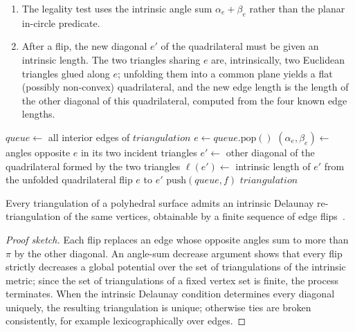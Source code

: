\begin{enumerate}
\item The legality test uses the intrinsic angle sum $\alpha_e + \beta_e$ rather than the planar in-circle predicate.
\item After a flip, the new diagonal $e'$ of the quadrilateral must be given an intrinsic length. The two triangles sharing $e$ are, intrinsically, two Euclidean triangles glued along $e$; unfolding them into a common plane yields a flat (possibly non-convex) quadrilateral, and the new edge length is the length of the other diagonal of this quadrilateral, computed from the four known edge lengths.
\end{enumerate}

\begin{algorithm}[htbp]
\caption{Intrinsic Delaunay Flip Algorithm}
\label{alg:intrinsic_delaunay_flip}
\begin{algorithmic}[1]
  \State $queue \gets$ all interior edges of $triangulation$
    \State $e \gets queue.\text{pop}()$
    \State $(\alpha_e, \beta_e) \gets$ angles opposite $e$ in its two incident triangles
      \State $e' \gets$ other diagonal of the quadrilateral formed by the two triangles
      \State $\ell(e') \gets$ intrinsic length of $e'$ from the unfolded quadrilateral
      \State flip $e$ to $e'$
        \State $\text{push}(queue, f)$
      \EndFor
    \EndIf
  \EndWhile
  \State \Return $triangulation$
\EndFunction
\end{algorithmic}
\end{algorithm}

\begin{theorem}\label{thm:intrinsic_delaunay_exists}
Every triangulation of a polyhedral surface admits an intrinsic Delaunay re-triangulation of the same vertices, obtainable by a finite sequence of edge flips~\cite{bobenko2007,fisher2007}.
\end{theorem}
\begin{proof}[Proof sketch]
Each flip replaces an edge whose opposite angles sum to more than $\pi$ by the other diagonal. An angle-sum decrease argument shows that every flip strictly decreases a global potential over the set of triangulations of the intrinsic metric; since the set of triangulations of a fixed vertex set is finite, the process terminates. When the intrinsic Delaunay condition determines every diagonal uniquely, the resulting triangulation is unique; otherwise ties are broken consistently, for example lexicographically over edges.
\end{proof}


